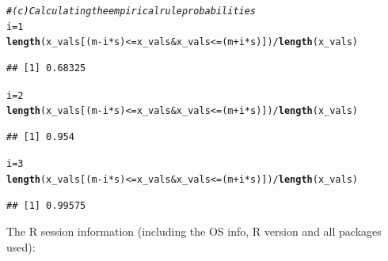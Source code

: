 \documentclass{article}\usepackage[]{graphicx}\usepackage[]{color}
\makeatletter
\newcommand{\hlnum}[1]{\textcolor[rgb]{0.686,0.059,0.569}{#1}}%
\newcommand{\hlcom}[1]{\textcolor[rgb]{0.678,0.584,0.686}{\textit{#1}}}%
\newcommand{\hlopt}[1]{\textcolor[rgb]{0,0,0}{#1}}%
\newcommand{\hlstd}[1]{\textcolor[rgb]{0.345,0.345,0.345}{#1}}%
\newcommand{\hlkwb}[1]{\textcolor[rgb]{0.69,0.353,0.396}{#1}}%
\newcommand{\hlkwd}[1]{\textcolor[rgb]{0.737,0.353,0.396}{\textbf{#1}}}%
\newenvironment{kframe}{%
 \def\at@end@of@kframe{}%
 \ifinner\ifhmode%
  \def\at@end@of@kframe{\end{minipage}}%
  \begin{minipage}{\columnwidth}%
 \fi\fi%
 \def\FrameCommand##1{\hskip\@totalleftmargin \hskip-\fboxsep
 \colorbox{shadecolor}{##1}\hskip-\fboxsep
     \hskip-\linewidth \hskip-\@totalleftmargin \hskip\columnwidth}%
 \MakeFramed {\advance\hsize-\width
   \@totalleftmargin\z@ \linewidth\hsize
   \@setminipage}}%
 {\par\unskip\endMakeFramed%
 \at@end@of@kframe}
\newenvironment{knitrout}{}{} %
\makeatother
\begin{document}
\begin{knitrout}
{}


\begin{kframe}\begin{alltt}
\hlcom{#(c) Calculating the empirical rule probabilities}
\hlstd{i} \hlkwb{=} \hlnum{1}
\hlkwd{length}\hlstd{(x_vals[(m}\hlopt{-}\hlstd{i}\hlopt{*}\hlstd{s)} \hlopt{<=} \hlstd{x_vals} \hlopt{&} \hlstd{x_vals} \hlopt{<=} \hlstd{(m}\hlopt{+}\hlstd{i}\hlopt{*}\hlstd{s)])} \hlopt{/} \hlkwd{length}\hlstd{(x_vals)}
\end{alltt}
\begin{verbatim}
## [1] 0.68325
\end{verbatim}
\begin{alltt}
\hlstd{i} \hlkwb{=} \hlnum{2}
\hlkwd{length}\hlstd{(x_vals[(m}\hlopt{-}\hlstd{i}\hlopt{*}\hlstd{s)} \hlopt{<=} \hlstd{x_vals} \hlopt{&} \hlstd{x_vals} \hlopt{<=} \hlstd{(m}\hlopt{+}\hlstd{i}\hlopt{*}\hlstd{s)])} \hlopt{/} \hlkwd{length}\hlstd{(x_vals)}
\end{alltt}
\begin{verbatim}
## [1] 0.954
\end{verbatim}
\begin{alltt}
\hlstd{i} \hlkwb{=} \hlnum{3}
\hlkwd{length}\hlstd{(x_vals[(m}\hlopt{-}\hlstd{i}\hlopt{*}\hlstd{s)} \hlopt{<=} \hlstd{x_vals} \hlopt{&} \hlstd{x_vals} \hlopt{<=} \hlstd{(m}\hlopt{+}\hlstd{i}\hlopt{*}\hlstd{s)])} \hlopt{/} \hlkwd{length}\hlstd{(x_vals)}
\end{alltt}
\begin{verbatim}
## [1] 0.99575
\end{verbatim}
\end{kframe}
\end{knitrout}

The R session information (including the OS info, R version and all
packages used):
\end{document}
